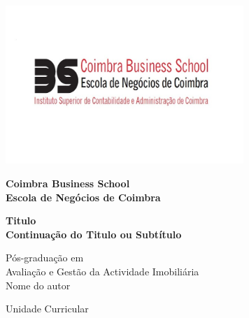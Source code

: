     \begin{titlepage}

	\thispagestyle{empty}
	
	\begin{flushleft} ~\\ \vspace{-12mm} \hspace{12mm} 
		\includegraphics[width=9.0cm]{./pic/CBS_Logo.jpg}
	\end{flushleft}

	\vspace{-2.5cm}
	
	\vspace{2.0cm}
	\centering \bfseries \Large Coimbra Business School \\
	\centering \bfseries \large Escola de Negócios de Coimbra
	\vspace{2.5cm}
	\normalsize 

	\centering \begin{minipage}[t]{17cm}
		\centering \bfseries \large Titulo \\
		 Continuação do Titulo ou Subtítulo
		\medskip
	\end{minipage}

	\vspace{3.5cm}

	\begin{minipage}[t]{10cm}
	\centering Pós-graduação em\\
	 Avaliação e Gestão da Actividade Imobiliária \\
		\centering \large Nome do autor %
	\end{minipage}
		
    \vspace{3cm}
    \normalsize Unidade Curricular
	

\end{titlepage}
